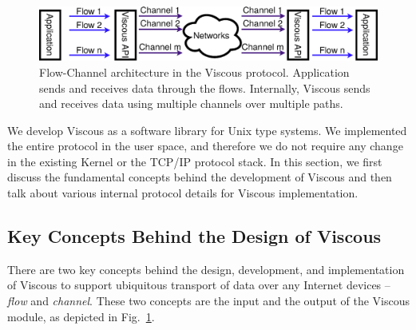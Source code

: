 


\begin{figure}[!ht]
	\centering
	\includegraphics[width=\linewidth]{img/sys-io}
	\caption{Flow-Channel architecture in the Viscous protocol. Application sends and receives data through the flows. Internally, Viscous sends and receives data using multiple channels over multiple paths.}
	\label{fig:sys-io}
\end{figure}




%
We develop Viscous as a software library for Unix type systems. We implemented the entire protocol in the user space, and therefore we do not require any change in the existing Kernel or the TCP/IP protocol stack. In this section, we first discuss the fundamental concepts behind the development of Viscous and then talk about various internal protocol details for Viscous implementation.
%
\subsection{Key Concepts Behind the Design of Viscous}
There are two key concepts behind the design, development, and implementation of Viscous to support ubiquitous transport of data over any Internet devices -- \textit{flow} and \textit{channel}. These two concepts are the input and the output of the Viscous module, as depicted in Fig.~\ref{fig:sys-io}.

